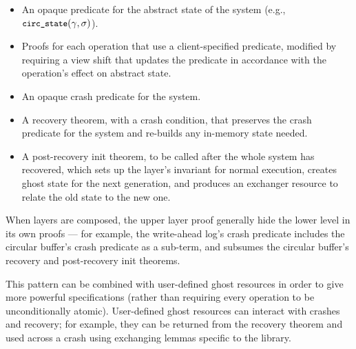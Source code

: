 \begin{itemize}
  \item An opaque predicate for the abstract state of the system (e.g.,
        $\circstate(\gamma, \sigma)$).
  \item Proofs for each operation that use a client-specified predicate,
        modified by requiring a view shift that updates the predicate in
        accordance with the operation's effect on abstract state.
  \item An opaque crash predicate for the system.
  \item A recovery theorem, with a crash condition, that preserves the crash
  predicate for the system and re-builds any in-memory state needed.
  \item A post-recovery init theorem, to be called after the whole system has
        recovered, which sets up the layer's invariant for normal execution,
        creates ghost state for the next generation, and produces an exchanger
        resource to relate the old state to the new one.
\end{itemize}

When layers are composed, the upper layer proof generally hide the lower level
in its own proofs --- for example, the write-ahead log's crash predicate
includes the circular buffer's crash predicate as a sub-term, and subsumes the
circular buffer's recovery and post-recovery init theorems.

This pattern can be combined with user-defined ghost resources in order to give
more powerful specifications (rather than requiring every operation to be
unconditionally atomic). User-defined ghost resources can interact with crashes
and recovery; for example, they can be returned from the recovery theorem and
used across a crash using exchanging lemmas specific to the library.
